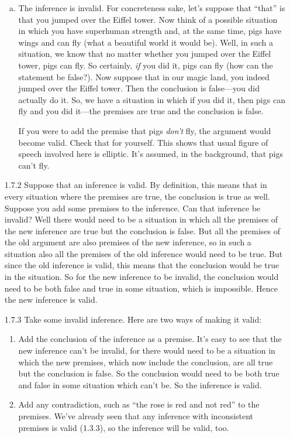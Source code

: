 \begin{enumerate}
\begin{enumerate}[(a)]
			\item The inference is invalid. For concreteness sake, let's suppose that ``that'' is that you jumped over the Eiffel tower. Now think of a possible situation in which you have superhuman strength and, at the same time, pigs have wings and can fly (what a beautiful world it would be). Well, in such a situation, we know that no matter whether you jumped over the Eiffel tower, pigs can fly. So certainly, \emph{if} you did it, pigs can fly (how can the statement be false?). Now suppose that in our magic land, you indeed jumped over the Eiffel tower. Then the conclusion is false---you did actually do it. So, we have a situation in which if you did it, then pigs can fly and you did it---the premises are true and the conclusion is false. 
			
			If you were to add the premise that pigs \emph{don't} fly, the argument would become valid. Check that for yourself. This shows that usual figure of speech involved here is elliptic. It's assumed, in the background, that pigs can't fly.
		
		\end{enumerate}
		
	\item[1.7.2] Suppose that an inference is valid. By definition, this means that in every situation where the premises are true, the conclusion is true as well. Suppose you add some premises to the inference. Can that inference be invalid? Well there would need to be a situation in which all the premises of the new inference are true but the conclusion is false. But all the premises of the old argument are also premises of the new inference, so in such a situation also all the premises of the old inference would need to be true. But since the old inference is valid, this means that the conclusion would be true in the situation. So for the new inference to be invalid, the conclusion would need to be both false and true in some situation, which is impossible. Hence the new inference is valid.
	
	\item[1.7.3] Take some invalid inference. Here are two ways of making it valid:
	
		\begin{enumerate}[(1)]
		
			\item Add the conclusion of the inference as a premise. It's easy to see that the new inference can't be invalid, for there would need to be a situation in which the new premises, which now include the conclusion, are all true but the conclusion is false. So the conclusion would need to be both true and false in some situation which can't be. So the inference is valid.
			
			\item Add any contradiction, such as ``the rose is red and not red'' to the premises. We've already seen that any inference with inconsistent premises is valid (1.3.3), so the inference will be valid, too.
		
		\end{enumerate}
		
	\end{enumerate}
	
